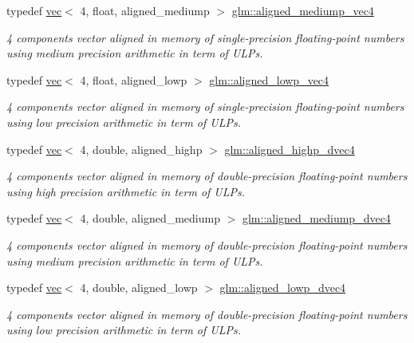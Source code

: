 \begin{DoxyCompactItemize}
typedef \mbox{\hyperlink{structglm_1_1vec}{vec}}$<$ 4, float, aligned\+\_\+mediump $>$ \mbox{\hyperlink{group__gtc__type__aligned_ga83fa079eb8188b8acb4e90589ce5dddb}{glm\+::aligned\+\_\+mediump\+\_\+vec4}}
\begin{DoxyCompactList}\small\item\em 4 components vector aligned in memory of single-\/precision floating-\/point numbers using medium precision arithmetic in term of U\+L\+Ps. \end{DoxyCompactList}\item 
typedef \mbox{\hyperlink{structglm_1_1vec}{vec}}$<$ 4, float, aligned\+\_\+lowp $>$ \mbox{\hyperlink{group__gtc__type__aligned_gaba45497051d04e2aa681653c14fc023c}{glm\+::aligned\+\_\+lowp\+\_\+vec4}}
\begin{DoxyCompactList}\small\item\em 4 components vector aligned in memory of single-\/precision floating-\/point numbers using low precision arithmetic in term of U\+L\+Ps. \end{DoxyCompactList}\item 
typedef \mbox{\hyperlink{structglm_1_1vec}{vec}}$<$ 4, double, aligned\+\_\+highp $>$ \mbox{\hyperlink{group__gtc__type__aligned_ga4b7b03b9178c6f0574c26181a054beec}{glm\+::aligned\+\_\+highp\+\_\+dvec4}}
\begin{DoxyCompactList}\small\item\em 4 components vector aligned in memory of double-\/precision floating-\/point numbers using high precision arithmetic in term of U\+L\+Ps. \end{DoxyCompactList}\item 
typedef \mbox{\hyperlink{structglm_1_1vec}{vec}}$<$ 4, double, aligned\+\_\+mediump $>$ \mbox{\hyperlink{group__gtc__type__aligned_gab825a10044970cfc9b5fbb6cfa58b640}{glm\+::aligned\+\_\+mediump\+\_\+dvec4}}
\begin{DoxyCompactList}\small\item\em 4 components vector aligned in memory of double-\/precision floating-\/point numbers using medium precision arithmetic in term of U\+L\+Ps. \end{DoxyCompactList}\item 
typedef \mbox{\hyperlink{structglm_1_1vec}{vec}}$<$ 4, double, aligned\+\_\+lowp $>$ \mbox{\hyperlink{group__gtc__type__aligned_ga0c40d2f75a8bdae67116c4c973252baf}{glm\+::aligned\+\_\+lowp\+\_\+dvec4}}
\begin{DoxyCompactList}\small\item\em 4 components vector aligned in memory of double-\/precision floating-\/point numbers using low precision arithmetic in term of U\+L\+Ps. \end{DoxyCompactList}\item 

\end{DoxyCompactItemize}
